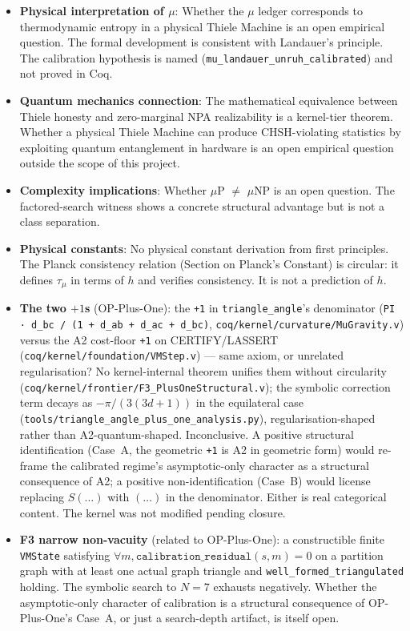 \documentclass[11pt, a4paper]{report}
\theoremstyle{definition}
\theoremstyle{plain}
\begin{document}
\begin{itemize}
\item \textbf{Physical interpretation of $\mu$}: Whether the $\mu$ ledger corresponds to thermodynamic entropy in a physical Thiele Machine is an open empirical question. The formal development is consistent with Landauer's principle. The calibration hypothesis is named (\texttt{mu\_landauer\_unruh\_calibrated}) and not proved in Coq.
\item \textbf{Quantum mechanics connection}: The mathematical equivalence between Thiele honesty and zero-marginal NPA realizability is a kernel-tier theorem. Whether a physical Thiele Machine can produce CHSH-violating statistics by exploiting quantum entanglement in hardware is an open empirical question outside the scope of this project.
\item \textbf{Complexity implications}: Whether $\mu$P $\neq$ $\mu$NP is an open question. The factored-search witness shows a concrete structural advantage but is not a class separation.
\item \textbf{Physical constants}: No physical constant derivation from first principles. The Planck consistency relation (Section on Planck's Constant) is circular: it defines $\tau_\mu$ in terms of $h$ and verifies consistency. It is not a prediction of $h$.
\item \textbf{The two $+1$s} (OP-Plus-One): the \texttt{+1} in \texttt{triangle\_angle}'s denominator (\texttt{PI · d\_bc / (1 + d\_ab + d\_ac + d\_bc)}, \texttt{coq/kernel/curvature/MuGravity.v}) versus the A2 cost-floor \texttt{+1} on CERTIFY/LASSERT (\texttt{coq/kernel/foundation/VMStep.v}) — same axiom, or unrelated regularisation? No kernel-internal theorem unifies them without circularity (\texttt{coq/kernel/frontier/F3\_PlusOneStructural.v}); the symbolic correction term decays as $-\pi / (3(3d+1))$ in the equilateral case (\texttt{tools/triangle\_angle\_plus\_one\_analysis.py}), regularisation-shaped rather than A2-quantum-shaped. Inconclusive. A positive structural identification (Case~A, the geometric \texttt{+1} is A2 in geometric form) would re-frame the calibrated regime's asymptotic-only character as a structural consequence of A2; a positive non-identification (Case~B) would license replacing $S(\dots)$ with $(\dots)$ in the denominator. Either is real categorical content. The kernel was not modified pending closure.
\item \textbf{F3 narrow non-vacuity} (related to OP-Plus-One): a constructible finite \texttt{VMState} satisfying $\forall m, \texttt{calibration\_residual}(s, m) = 0$ on a partition graph with at least one actual graph triangle and \texttt{well\_formed\_triangulated} holding. The symbolic search to $N = 7$ exhausts negatively. Whether the asymptotic-only character of calibration is a structural consequence of OP-Plus-One's Case~A, or just a search-depth artifact, is itself open.
\end{itemize}
\end{document}
